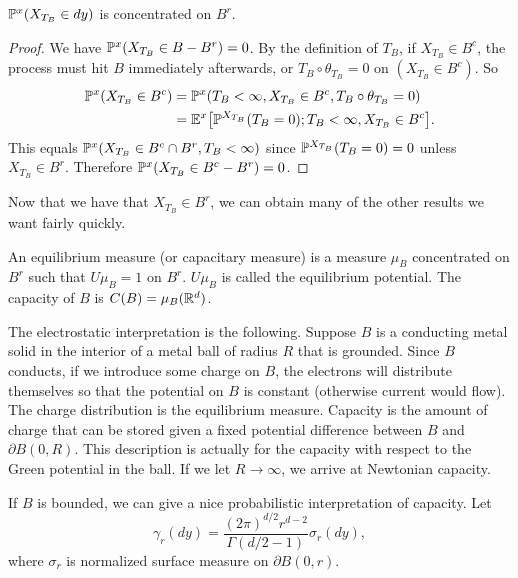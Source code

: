 \begin{corollary}\label{cor:ch2_5.6}
$\P^x(X_{T_B} \in dy)$ is concentrated on $B^r$.
\end{corollary}

\begin{proof}
We have $\P^x(X_{T_B} \in B - B^r) = 0$. By the definition of $T_B$, if $X_{T_B} \in B^c$, the process must hit $B$ immediately afterwards, or $T_B \circ \theta_{T_B} = 0$ on $(X_{T_B} \in B^c)$. So
\begin{align*}
    \P^x(X_{T_B} \in B^c) &= \P^x(T_B < \infty, X_{T_B} \in B^c, T_B \circ \theta_{T_B} = 0) \\
    &= \E^x\big[\P^{X_{T_B}}(T_B = 0); T_B < \infty, X_{T_B} \in B^c\big].
\end{align*}
This equals $\P^x(X_{T_B} \in B^c \cap B^r, T_B < \infty)$ since $\P^{X_{T_B}}(T_B = 0) = 0$ unless $X_{T_B} \in B^r$. Therefore $\P^x(X_{T_B} \in B^c - B^r) = 0$.
\end{proof}


Now that we have that $X_{T_B} \in B^r$, we can obtain many of the other results we want fairly quickly.

\begin{definition}\label{def:ch2_5.7}
An equilibrium measure (or capacitary measure) is a measure $\mu_B$ concentrated on $B^r$ such that $U\mu_B = 1$ on $B^r$. $U\mu_B$ is called the equilibrium potential. The capacity of $B$ is $C(B) = \mu_B(\R^d)$.
\end{definition}

The electrostatic interpretation is the following. Suppose $B$ is a conducting metal solid in the interior of a metal ball of radius $R$ that is grounded. Since $B$ conducts, if we introduce some charge on $B$, the electrons will distribute themselves so that the potential on $B$ is constant (otherwise current would flow). The charge distribution is the equilibrium measure. Capacity is the amount of charge that can be stored given a fixed potential difference between $B$ and $\partial B(0,R)$. This description is actually for the capacity with respect to the Green potential in the ball. If we let $R \to \infty$, we arrive at Newtonian capacity.


If $B$ is bounded, we can give a nice probabilistic interpretation of capacity. Let
\begin{equation}\label{eq:ch2_5.7}
    \gamma_r(dy) = \frac{(2\pi)^{d/2}r^{d-2}}{\mathit{\Gamma(d/2-1)}}\sigma_r(dy),
\end{equation}
where $\sigma_r$ is normalized surface measure on $\partial B(0,r)$.

